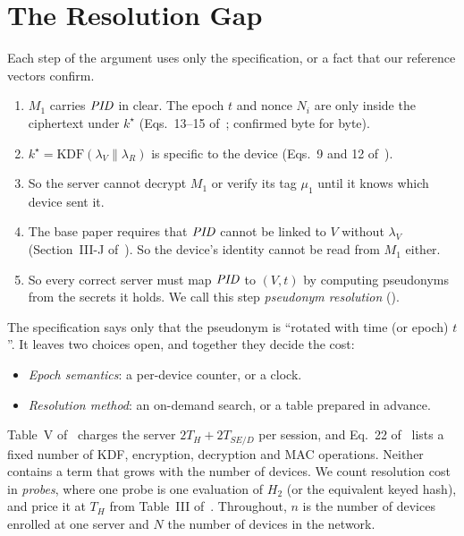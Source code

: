 \section{The Resolution Gap}\label{sec:gap}
\ifshortpaper\else
Each step of the argument uses only the specification, or a fact that our reference vectors confirm.
\fi
\begin{enumerate}
\item $M_1$ carries $\mathit{PID}$ in clear. The epoch $t$ and nonce $N_i$ are only inside the ciphertext under $k^\star$
(Eqs.~13--15 of~\cite{base}; confirmed byte for byte).
\item $k^\star=\mathrm{KDF}(\lambda_V\|\lambda_R)$ is specific to the device (Eqs.~9 and 12 of~\cite{base}).
\item So the server cannot decrypt $M_1$ or verify its tag $\mu_1$ until it knows which device sent it.
\item The base paper requires that $\mathit{PID}$ cannot be linked to $V$ without $\lambda_V$ (Section~III-J of~\cite{base}). So
the device's identity cannot be read from $M_1$ either.
\item So every correct server must map $\mathit{PID}$ to $(V,t)$ by computing pseudonyms from the secrets it holds. We call this
step \emph{pseudonym resolution} ().
\end{enumerate}

The specification says only that the pseudonym is ``rotated with time (or epoch) $t$''. It leaves two choices open, and
together they decide the cost:
\begin{itemize}
\item \emph{Epoch semantics}: a per-device counter, or a clock.
\item \emph{Resolution method}: an on-demand search, or a table prepared in advance.
\end{itemize}

Table~V of~\cite{base} charges the server $2T_H+2T_{SE/D}$ per session, and Eq.~22 of~\cite{base} lists a fixed number of
KDF, encryption, decryption and MAC operations. Neither contains a term that grows with the number of devices. We count
resolution cost in \emph{probes}, where one probe is one evaluation of $H_2$ (or the equivalent keyed hash), and price it
at $T_H$ from Table~III of~\cite{base}. Throughout, $n$ is the number of devices enrolled at one server and $N$ the number
of devices in the network.


